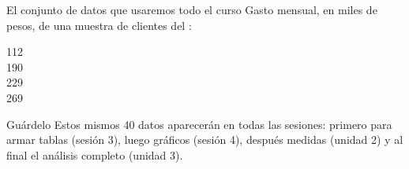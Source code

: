\documentclass[aspectratio=169,10pt]{beamer}
\begin{document}
\begin{frame}{El conjunto de datos que usaremos todo el curso}
  \footnotesize
  Gasto mensual, en miles de pesos, de una muestra de 
  clientes del :

  \vspace{0.2cm}
  \begin{center}
  \ttfamily\scriptsize
  112\\
  190\\
  229\\
  269
  \end{center}

  \vspace{0.2cm}
  \begin{alertblock}{Guárdelo}
    \scriptsize
    Estos mismos 40 datos aparecerán en todas las sesiones: primero para armar
    tablas (sesión 3), luego gráficos (sesión 4), después medidas (unidad 2) y
    al final el análisis completo (unidad 3). 
  \end{alertblock}
\end{frame}
\end{document}
